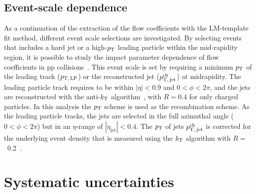 \subsection{Event-scale dependence}
As a continuation of the extraction of the flow coefficients with the LM-template fit method, different event scale selections are investigated. By selecting events that includes a hard jet or a high-$p_\mathrm{T}$ leading particle within the mid-rapidity region, it is possible to study the impact parameter dependence of flow coefficients in pp collisions~\cite{Sjostrand:1986ep,Frankfurt:2010ea}. This event scale is set by requiring a minimum $p_\mathrm{T}$ of the leading track ($p_\mathrm{T,\,LP}$) or the reconstructed jet ($p_\mathrm{T,\,jet}^\mathrm{ch}$) at midrapidity. The leading particle track requires to be within $|\eta|<0.9$ and $0<\phi<2\pi$, and the jets are reconstructed with the anti-$k_{\rm{T}}$ algorithm~\cite{Cacciari:2008gp,Cacciari:2011ma}, with $R=0.4$ for only charged particles. In this analysis the $p_\mathrm{T}$ scheme is used as the recombination scheme. As the leading particle tracks, the jets are selected in the full azimuthal angle ($0<\phi<2\pi$) but in an $\eta$-range of $|\eta_\mathrm{jet}|<0.4$. The $p_\mathrm{T}$ of jets $p_\mathrm{T,\,jet}^\mathrm{ch}$ is corrected for the underlying event density that is measured using the $k_{\rm{T}}$ algorithm with $R=$~0.2~\cite{Acharya:2018eat}.


\section{Systematic uncertainties}
\label{sec:uncertainties}

